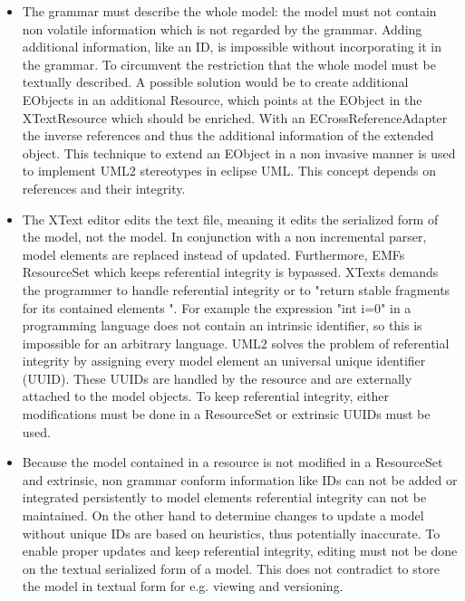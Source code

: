 \begin{itemize}
	\item The grammar must describe the whole model: the model must not contain non volatile information which is not regarded by the grammar. Adding additional information, like an ID, is impossible without incorporating it in the grammar. To circumvent the restriction that the whole model must be textually described. A possible solution would be to create additional EObjects in an additional Resource, which points at the EObject in the XTextResource which should be enriched. With an ECrossReferenceAdapter the inverse references and thus the additional information of the extended object. This technique to extend an EObject in a non invasive manner is used to implement UML2 stereotypes in eclipse UML. This concept depends on references and their integrity.
	\item The XText editor edits the text file, meaning it edits the serialized form of the model, not the model. In conjunction with a non incremental parser, model elements are replaced instead of updated. Furthermore, EMFs ResourceSet which keeps referential integrity is bypassed. XTexts demands the programmer to handle referential integrity or to "return stable fragments for its contained elements ". For example the expression "int i=0" in a programming language does not contain an intrinsic identifier, so this is impossible for an arbitrary language. UML2 solves the problem of referential integrity by assigning every model element an universal unique identifier (UUID). These UUIDs are handled by the resource and are  externally attached to the model objects. To keep referential integrity, either modifications must be done in a ResourceSet or extrinsic UUIDs must be used. 
	\item Because the model contained in a resource is not modified in a ResourceSet and extrinsic, non grammar conform information like IDs can not be added or integrated persistently to model elements referential integrity can not be maintained. On the other hand to determine changes to update a model without unique IDs are based on heuristics, thus potentially inaccurate.  To enable proper updates and keep referential integrity, editing must not be done on the textual serialized form of a model. This does not contradict to store the model in textual form for e.g. viewing and versioning. 
\end{itemize}

